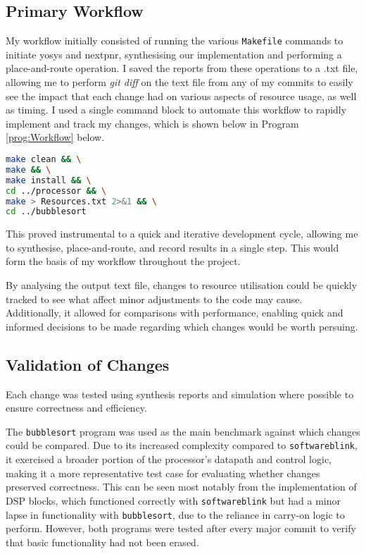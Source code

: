 \documentclass[a4paper,10pt]{article}
\begin{document}
\subsection*{Primary Workflow}
My workflow initially consisted of running the various \texttt{Makefile}
commands to initiate yosys and nextpnr, 
synthesising our implementation and performing a place-and-route operation.
I saved the reports from these operations to a .txt file, 
allowing me to perform \textit{git diff} on the text file 
from any of my commits to easily see the impact that each change had 
on various aspects of resource usage, as well as timing.
I used a single command block to automate this workflow 
to rapidly implement and track my changes, 
which is shown below in Program \ref{prog:Workflow} below.

\begin{lstlisting}[language=bash,
    caption={Workflow used to synthesise and record results},
    label={prog:Workflow}]
make clean && \
make && \
make install && \
cd ../processor && \
make > Resources.txt 2>&1 && \
cd ../bubblesort
\end{lstlisting}

This proved instrumental to a quick and iterative development cycle, 
allowing me to synthesise, place-and-route, and record results in a single step.
This would form the basis of my workflow throughout the project.

By analysing the output text file, changes to resource utilisation
could be quickly tracked to see what affect minor adjustments to the code may cause.
Additionally, it allowed for comparisons with performance,
enabling quick and informed decisions to be made regarding which changes 
would be worth persuing.

\subsection*{Validation of Changes}

Each change was tested using synthesis reports and 
simulation where possible to ensure correctness and efficiency.

The \texttt{bubblesort} program was used as the main benchmark 
against which changes could be compared. 
Due to its increased complexity compared to \texttt{softwareblink}, 
it exercised a broader portion of the processor's datapath and control logic, 
making it a more representative test case for evaluating 
whether changes preserved correctness. 
This can be seen most notably from the implementation of DSP blocks,
which functioned correctly with \texttt{softwareblink} 
but had a minor lapse in functionality with \texttt{bubblesort},
due to the reliance in carry-on logic to perform.
However, both programs were tested after every major commit to verify 
that basic functionality had not been erased.
\end{document}
